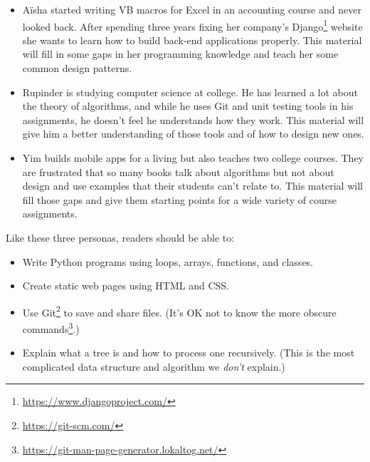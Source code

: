 \documentclass{scrbook}
\newcommand{\hreffoot}[2]{{#1}\footnote{\href{#2}{#2}}}
\begin{document}
\begin{itemize}

\item 

Aïsha started writing VB macros for Excel in an accounting course and never looked back.
    After spending three years fixing her company's \hreffoot{Django}{https://www.djangoproject.com/} website
    she wants to learn how to build back-end applications properly.
    This material will fill in some gaps in her programming knowledge
    and teach her some common design patterns.



\item 

Rupinder is studying computer science at college.
    He has learned a lot about the theory of algorithms,
    and while he uses Git and unit testing tools in his assignments,
    he doesn't feel he understands how they work.
    This material will give him a better understanding of those tools
    and of how to design new ones.



\item 

Yim builds mobile apps for a living
    but also teaches two college courses.
    They are frustrated that so many books talk about algorithms but not about design
    and use examples that their students can't relate to.
    This material will fill those gaps
    and give them starting points for a wide variety of course assignments.



\end{itemize}


Like these three personas, readers should be able to:

\begin{itemize}

\item 

Write Python programs using loops, arrays, functions, and classes.



\item 

Create static web pages using HTML and CSS.



\item 

Use \hreffoot{Git}{https://git-scm.com/} to save and share files.
    (It's OK not to know \hreffoot{the more obscure commands}{https://git-man-page-generator.lokaltog.net/}.)



\item 

Explain what a tree is and how to process one recursively.
    (This is the most complicated data structure and algorithm we \emph{don't} explain.)



\end{itemize}
\end{document}
